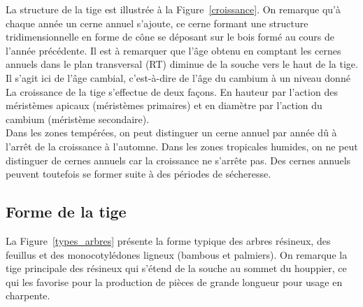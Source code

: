 La structure de la tige est illustrée à la Figure~\ref{croissance}. On remarque qu'à chaque année un cerne annuel s'ajoute, ce cerne formant une structure tridimensionnelle en forme de cône se déposant sur le bois formé au cours de l'année précédente. Il est à remarquer que l'âge obtenu en comptant les cernes annuels dans le plan transversal (RT) diminue de la souche vers le haut de la tige. Il s'agit ici de l'âge cambial, c'est-à-dire de l'âge du cambium à un niveau donné \\
 
La croissance de la tige s'effectue de deux façons. En hauteur par l'action des méristèmes apicaux (méristèmes primaires) et en diamètre par l'action du cambium (méristème secondaire).\\
 
Dans les zones tempérées, on peut distinguer un cerne annuel par année dû à l'arrêt de la croissance à l'automne. Dans les zones tropicales humides, on ne peut distinguer de cernes annuels car la croissance ne s'arrête pas. Des cernes annuels peuvent toutefois se former suite à des périodes de sécheresse. 
 
\subsection{Forme de la tige}
 
La Figure~\ref{types_arbres} présente la forme typique des arbres résineux, des feuillus et des monocotylédones ligneux (bambous et palmiers). On remarque la tige principale des résineux qui s'étend de la souche au sommet du houppier, ce qui les favorise pour la production de pièces de grande longueur pour usage en charpente. 


